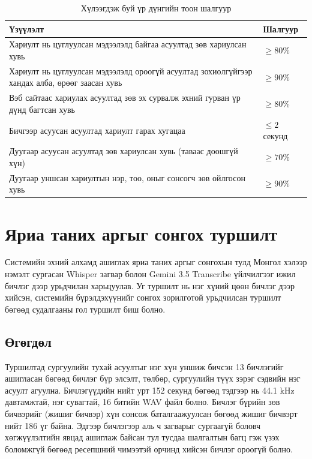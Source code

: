 \begin{table}[htbp]
\centering
\caption{Хүлээгдэж буй үр дүнгийн тоон шалгуур}
\label{tab:expected_results}
\begin{tabular}{|p{9.6cm}|p{3.6cm}|}
\hline
\textbf{Үзүүлэлт} & \textbf{Шалгуур} \\
\hline
Хариулт нь цуглуулсан мэдээлэлд байгаа асуултад зөв хариулсан хувь & $\geq 80\%$ \\
\hline
Хариулт нь цуглуулсан мэдээлэлд ороогүй асуултад зохиолгүйгээр хандах алба, өрөөг заасан хувь & $\geq 90\%$ \\
\hline
Вэб сайтаас хариулах асуултад зөв эх сурвалж эхний гурван үр дүнд багтсан хувь & $\geq 80\%$ \\
\hline
Бичгээр асуусан асуултад хариулт гарах хугацаа & $\leq 2$ секунд \\
\hline
Дуугаар асуусан асуултад зөв хариулсан хувь (таваас доошгүй хүн) & $\geq 70\%$ \\
\hline
Дуугаар уншсан хариултын нэр, тоо, оныг сонсогч зөв ойлгосон хувь & $\geq 90\%$ \\
\hline
\end{tabular}
\end{table}

\section{Яриа таних аргыг сонгох туршилт}
\label{sec:exp-stt}

Системийн эхний алхамд ашиглах яриа таних аргыг сонгохын тулд Монгол хэлээр нэмэлт сургасан Whisper загвар болон Gemini 3.5 Transcribe үйлчилгээг ижил бичлэг дээр урьдчилан харьцуулав. Уг туршилт нь нэг хүний цөөн бичлэг дээр хийсэн, системийн бүрэлдэхүүнийг сонгох зорилготой урьдчилсан туршилт бөгөөд судалгааны гол туршилт биш болно.

\subsection{Өгөгдөл}
\label{sec:stt-data}

Туршилтад сургуулийн тухай асуултыг нэг хүн уншиж бичсэн 13 бичлэгийг ашигласан бөгөөд бичлэг бүр элсэлт, төлбөр, сургуулийн түүх зэрэг сэдвийн нэг асуулт агуулна. Бичлэгүүдийн нийт урт 152 секунд бөгөөд тэдгээр нь 44.1 kHz давтамжтай, нэг сувагтай, 16 битийн WAV файл болно. Бичлэг бүрийн зөв бичвэрийг (жишиг бичвэр) хүн сонсож баталгаажуулсан бөгөөд жишиг бичвэрт нийт 186 үг байна. Эдгээр бичлэгээр аль ч загварыг сургаагүй боловч хөгжүүлэлтийн явцад ашиглаж байсан тул тусдаа шалгалтын багц гэж үзэх боломжгүй бөгөөд ресепшний чимээтэй орчинд хийсэн бичлэг ороогүй болно.

